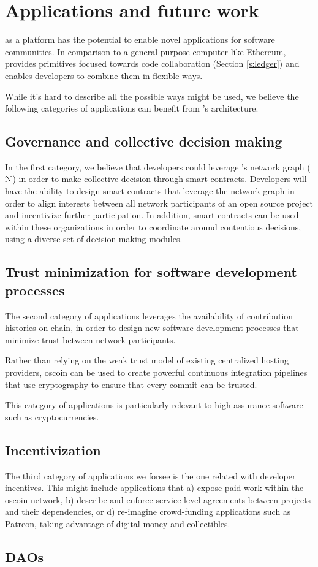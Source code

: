 \section{Applications and future work}

\oscoin{} as a platform has the potential to enable novel applications for
software communities. In comparison to a general purpose computer like
Ethereum, \oscoin{} provides primitives focused towards code collaboration
(Section \ref{s:ledger}) and enables developers to combine them in flexible ways.

While it’s hard to describe all the possible ways \oscoin{} might be used, we
believe the following categories of applications can benefit from \oscoin{}’s
architecture.

\subsection{Governance and collective decision making}

In the first category, we believe that developers could leverage \oscoin{}’s
network graph ($\mathcal{N}$) in order to make collective decision through smart
contracts.  Developers will have the ability to design smart contracts that
leverage the network graph in order to align interests between all network
participants of an open source project and incentivize further participation.
In addition, smart contracts can be used within these organizations in order to
coordinate around contentious decisions, using a diverse set of decision making
modules.

\subsection{Trust minimization for software development processes}
The second category of applications leverages the availability of contribution
histories on chain, in order to design new software development processes that
minimize trust between network participants.

Rather than relying on the weak trust model of existing centralized hosting
providers, oscoin can be used to create powerful continuous integration
pipelines that use cryptography to ensure that every commit can be trusted.

This category of applications is particularly relevant to high-assurance
software such as cryptocurrencies.

\subsection{Incentivization}
The third category of applications we forsee is the one related with
developer incentives. This might include applications that a) expose paid work
within the oscoin network, b) describe and enforce service level agreements
between projects and their dependencies, or d) re-imagine crowd-funding
applications such as Patreon, taking advantage of digital money and collectibles.

\subsection{DAOs}

